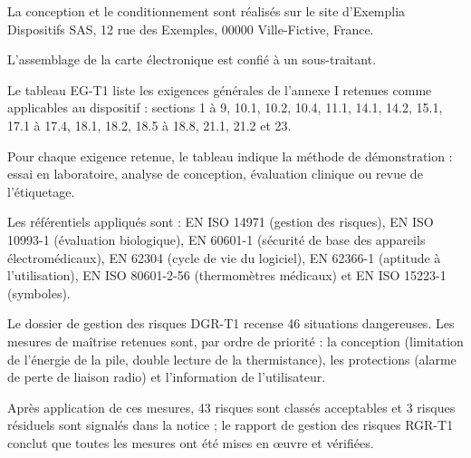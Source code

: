 \documentclass[11pt,a4paper]{article}
\begin{document}
\begin{Form}
{\small La conception et le conditionnement sont réalisés sur le site d'Exemplia Dispositifs SAS, 12 rue des Exemples, 00000 Ville-Fictive, France.}\par

{\small L'assemblage de la carte électronique est confié à un sous-traitant.}\par

\par{}\par

{\small Le tableau EG-T1 liste les exigences générales de l'annexe I retenues comme applicables au dispositif : sections 1 à 9, 10.1, 10.2, 10.4, 11.1, 14.1, 14.2, 15.1, 17.1 à 17.4, 18.1, 18.2, 18.5 à 18.8, 21.1, 21.2 et 23.}\par

{\small Pour chaque exigence retenue, le tableau indique la méthode de démonstration : essai en laboratoire, analyse de conception, évaluation clinique ou revue de l'étiquetage.}\par

{\small Les référentiels appliqués sont : EN ISO 14971 (gestion des risques), EN ISO 10993-1 (évaluation biologique), EN 60601-1 (sécurité de base des appareils électromédicaux), EN 62304 (cycle de vie du logiciel), EN 62366-1 (aptitude à l'utilisation), EN ISO 80601-2-56 (thermomètres médicaux) et EN ISO 15223-1 (symboles).}\par

\par{}\par

{\small Le dossier de gestion des risques DGR-T1 recense 46 situations dangereuses. Les mesures de maîtrise retenues sont, par ordre de priorité : la conception (limitation de l'énergie de la pile, double lecture de la thermistance), les protections (alarme de perte de liaison radio) et l'information de l'utilisateur.}\par

{\small Après application de ces mesures, 43 risques sont classés acceptables et 3 risques résiduels sont signalés dans la notice ; le rapport de gestion des risques RGR-T1 conclut que toutes les mesures ont été mises en œuvre et vérifiées.}\par

\par{}\par


\end{Form}
\end{document}
